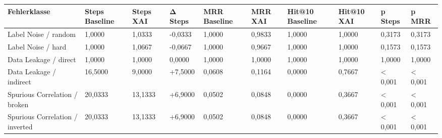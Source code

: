 \begin{tabular}{llllllllll}
\toprule
Fehlerklasse & Steps Baseline & Steps XAI & Δ Steps & MRR Baseline & MRR XAI & Hit@10 Baseline & Hit@10 XAI & p Steps & p MRR \\
\midrule
Label Noise / random & 1,0000 & 1,0333 & -0,0333 & 1,0000 & 0,9833 & 1,0000 & 1,0000 & 0,3173 & 0,3173 \\
Label Noise / hard & 1,0000 & 1,0667 & -0,0667 & 1,0000 & 0,9667 & 1,0000 & 1,0000 & 0,1573 & 0,1573 \\
Data Leakage / direct & 1,0000 & 1,0000 & 0,0000 & 1,0000 & 1,0000 & 1,0000 & 1,0000 & 1,0000 & 1,0000 \\
Data Leakage / indirect & 16,5000 & 9,0000 & +7,5000 & 0,0608 & 0,1164 & 0,0000 & 0,7667 & < 0,001 & < 0,001 \\
Spurious Correlation / broken & 20,0333 & 13,1333 & +6,9000 & 0,0502 & 0,0848 & 0,0000 & 0,3667 & < 0,001 & < 0,001 \\
Spurious Correlation / inverted & 20,0333 & 13,1333 & +6,9000 & 0,0502 & 0,0848 & 0,0000 & 0,3667 & < 0,001 & < 0,001 \\
\bottomrule
\end{tabular}

